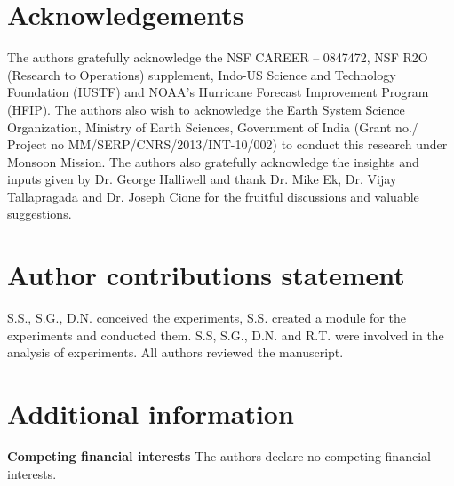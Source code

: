 \documentclass[fleqn,10pt]{wlscirep}
\begin{document}



\section*{Acknowledgements}

The authors gratefully acknowledge the NSF CAREER – 0847472, NSF R2O (Research to Operations) supplement, Indo-US Science and Technology Foundation (IUSTF) and NOAA’s Hurricane Forecast Improvement Program (HFIP). The authors also wish to acknowledge the Earth System Science Organization, Ministry of Earth Sciences, Government of India (Grant no./ Project no MM/SERP/CNRS/2013/INT-10/002) to conduct this research under Monsoon Mission. The authors also gratefully acknowledge the insights and inputs given by Dr. George Halliwell and thank Dr. Mike Ek, Dr. Vijay Tallapragada and Dr. Joseph Cione for the fruitful discussions and valuable suggestions.

\section*{Author contributions statement}

S.S., S.G., D.N. conceived the experiments, S.S. created a module for the experiments and conducted them. S.S, S.G., D.N. and R.T. were involved in the analysis of experiments. All authors reviewed the manuscript. 

\section*{Additional information}
\textbf{Competing financial interests}
The authors declare no competing financial interests.
\end{document}
